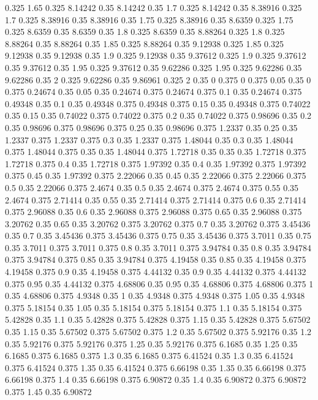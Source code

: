 0.325 1.65
0.325 8.14242
0.35 8.14242
0.35 1.7
0.325 8.14242
0.35 8.38916
0.325 1.7
0.325 8.38916
0.35 8.38916
0.35 1.75
0.325 8.38916
0.35 8.6359
0.325 1.75
0.325 8.6359
0.35 8.6359
0.35 1.8
0.325 8.6359
0.35 8.88264
0.325 1.8
0.325 8.88264
0.35 8.88264
0.35 1.85
0.325 8.88264
0.35 9.12938
0.325 1.85
0.325 9.12938
0.35 9.12938
0.35 1.9
0.325 9.12938
0.35 9.37612
0.325 1.9
0.325 9.37612
0.35 9.37612
0.35 1.95
0.325 9.37612
0.35 9.62286
0.325 1.95
0.325 9.62286
0.35 9.62286
0.35 2
0.325 9.62286
0.35 9.86961
0.325 2
0.35 0
0.375 0
0.375 0.05
0.35 0
0.375 0.24674
0.35 0.05
0.35 0.24674
0.375 0.24674
0.375 0.1
0.35 0.24674
0.375 0.49348
0.35 0.1
0.35 0.49348
0.375 0.49348
0.375 0.15
0.35 0.49348
0.375 0.74022
0.35 0.15
0.35 0.74022
0.375 0.74022
0.375 0.2
0.35 0.74022
0.375 0.98696
0.35 0.2
0.35 0.98696
0.375 0.98696
0.375 0.25
0.35 0.98696
0.375 1.2337
0.35 0.25
0.35 1.2337
0.375 1.2337
0.375 0.3
0.35 1.2337
0.375 1.48044
0.35 0.3
0.35 1.48044
0.375 1.48044
0.375 0.35
0.35 1.48044
0.375 1.72718
0.35 0.35
0.35 1.72718
0.375 1.72718
0.375 0.4
0.35 1.72718
0.375 1.97392
0.35 0.4
0.35 1.97392
0.375 1.97392
0.375 0.45
0.35 1.97392
0.375 2.22066
0.35 0.45
0.35 2.22066
0.375 2.22066
0.375 0.5
0.35 2.22066
0.375 2.4674
0.35 0.5
0.35 2.4674
0.375 2.4674
0.375 0.55
0.35 2.4674
0.375 2.71414
0.35 0.55
0.35 2.71414
0.375 2.71414
0.375 0.6
0.35 2.71414
0.375 2.96088
0.35 0.6
0.35 2.96088
0.375 2.96088
0.375 0.65
0.35 2.96088
0.375 3.20762
0.35 0.65
0.35 3.20762
0.375 3.20762
0.375 0.7
0.35 3.20762
0.375 3.45436
0.35 0.7
0.35 3.45436
0.375 3.45436
0.375 0.75
0.35 3.45436
0.375 3.7011
0.35 0.75
0.35 3.7011
0.375 3.7011
0.375 0.8
0.35 3.7011
0.375 3.94784
0.35 0.8
0.35 3.94784
0.375 3.94784
0.375 0.85
0.35 3.94784
0.375 4.19458
0.35 0.85
0.35 4.19458
0.375 4.19458
0.375 0.9
0.35 4.19458
0.375 4.44132
0.35 0.9
0.35 4.44132
0.375 4.44132
0.375 0.95
0.35 4.44132
0.375 4.68806
0.35 0.95
0.35 4.68806
0.375 4.68806
0.375 1
0.35 4.68806
0.375 4.9348
0.35 1
0.35 4.9348
0.375 4.9348
0.375 1.05
0.35 4.9348
0.375 5.18154
0.35 1.05
0.35 5.18154
0.375 5.18154
0.375 1.1
0.35 5.18154
0.375 5.42828
0.35 1.1
0.35 5.42828
0.375 5.42828
0.375 1.15
0.35 5.42828
0.375 5.67502
0.35 1.15
0.35 5.67502
0.375 5.67502
0.375 1.2
0.35 5.67502
0.375 5.92176
0.35 1.2
0.35 5.92176
0.375 5.92176
0.375 1.25
0.35 5.92176
0.375 6.1685
0.35 1.25
0.35 6.1685
0.375 6.1685
0.375 1.3
0.35 6.1685
0.375 6.41524
0.35 1.3
0.35 6.41524
0.375 6.41524
0.375 1.35
0.35 6.41524
0.375 6.66198
0.35 1.35
0.35 6.66198
0.375 6.66198
0.375 1.4
0.35 6.66198
0.375 6.90872
0.35 1.4
0.35 6.90872
0.375 6.90872
0.375 1.45
0.35 6.90872
